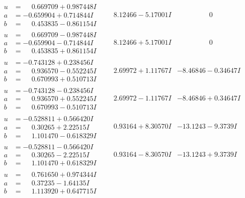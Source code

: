 \documentclass[1p]{elsarticle_modified}
\theoremstyle{definition}
\begin{document}
$$\begin{array}{c|c|c}
\begin{aligned}
u &= \phantom{-}0.669709 + 0.987448 I \\
a &= -0.659904 + 0.714844 I \\
b &= \phantom{-}0.453835 - 0.861154 I\end{aligned}
 & \phantom{-}8.12466 - 5.17001 I & \phantom{-0.000000 } 0 \\ \hline\begin{aligned}
u &= \phantom{-}0.669709 - 0.987448 I \\
a &= -0.659904 - 0.714844 I \\
b &= \phantom{-}0.453835 + 0.861154 I\end{aligned}
 & \phantom{-}8.12466 + 5.17001 I & \phantom{-0.000000 } 0 \\ \hline\begin{aligned}
u &= -0.743128 + 0.238456 I \\
a &= \phantom{-}0.936570 - 0.552245 I \\
b &= \phantom{-}0.670993 + 0.510713 I\end{aligned}
 & \phantom{-}2.69972 + 1.11767 I & -8.46846 - 0.34647 I \\ \hline\begin{aligned}
u &= -0.743128 - 0.238456 I \\
a &= \phantom{-}0.936570 + 0.552245 I \\
b &= \phantom{-}0.670993 - 0.510713 I\end{aligned}
 & \phantom{-}2.69972 - 1.11767 I & -8.46846 + 0.34647 I \\ \hline\begin{aligned}
u &= -0.528811 + 0.566420 I \\
a &= \phantom{-}0.30265 + 2.22515 I \\
b &= \phantom{-}1.101470 - 0.618329 I\end{aligned}
 & \phantom{-}0.93164 + 8.30570 I & -13.1243 - 9.3739 I \\ \hline\begin{aligned}
u &= -0.528811 - 0.566420 I \\
a &= \phantom{-}0.30265 - 2.22515 I \\
b &= \phantom{-}1.101470 + 0.618329 I\end{aligned}
 & \phantom{-}0.93164 - 8.30570 I & -13.1243 + 9.3739 I \\ \hline\begin{aligned}
u &= \phantom{-}0.761650 + 0.974344 I \\
a &= \phantom{-}0.37235 - 1.64135 I \\
b &= \phantom{-}1.113920 + 0.647715 I\end{aligned}

\end{array}$$
\end{document}
